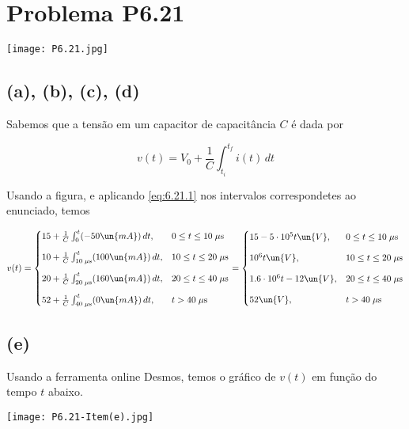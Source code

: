 
\section*{Problema P6.21}

\renewcommand*\thesection{6.21}

\begin{center}
    \texttt{[image: P6.21.jpg]}
\end{center}

\subsection*{(a), (b), (c), (d)}

Sabemos que a tensão em um capacitor de capacitância $C$ é dada por

\begin{equation}\label{eq:6.21.1}
    v(t) = V_0 + \frac{1}{C} \int_{t_i}^{t_f} i(t) \,dt
\end{equation}

Usando a figura, e aplicando \eqref{eq:6.21.1} nos intervalos correspondetes ao enunciado, temos

\[ v(t) =
    \begin{cases}
        15 + \frac{1}{C} \int_{0}^{t} (-50 \un{mA}) \,dt,            & 0 \leq t \leq 10 \;\mu\textrm{s}  \\
        \noalign{\vskip9pt}
        10 + \frac{1}{C} \int_{10 \;\mu\textrm{s}}^{t} (100 \un{mA}) \,dt,     & 10 \leq t \leq 20 \;\mu\textrm{s} \\
        \noalign{\vskip9pt}
        20 + \frac{1}{C} \int_{20 \;\mu\textrm{s}}^{t} (160 \un{mA}) \,dt, & 20 \leq t \leq 40 \;\mu\textrm{s} \\
        \noalign{\vskip9pt}
        52 + \frac{1}{C} \int_{40 \;\mu\textrm{s}}^{t} (0 \un{mA}) \,dt,           & t > 40 \;\mu\textrm{s}
    \end{cases}
    =
    \begin{cases}
        15 - 5 \cdot 10^{5}t \un{V},            & 0 \leq t \leq 10 \;\mu\textrm{s}  \\
        \noalign{\vskip9pt}
        10^{6}t \un{V},    & 10 \leq t \leq 20 \;\mu\textrm{s} \\
        \noalign{\vskip9pt}
        1.6 \cdot 10^{6}t - 12 \un{V}, & 20 \leq t \leq 40 \;\mu\textrm{s} \\
        \noalign{\vskip9pt}
        52 \un{V},            & t > 40 \;\mu\textrm{s}
    \end{cases}
\]

\subsection*{(e)}

Usando a ferramenta online Desmos, temos o gráfico de $v(t)$ em função do tempo $t$ abaixo.

\begin{center}
    \texttt{[image: P6.21-Item(e).jpg]}
\end{center}





